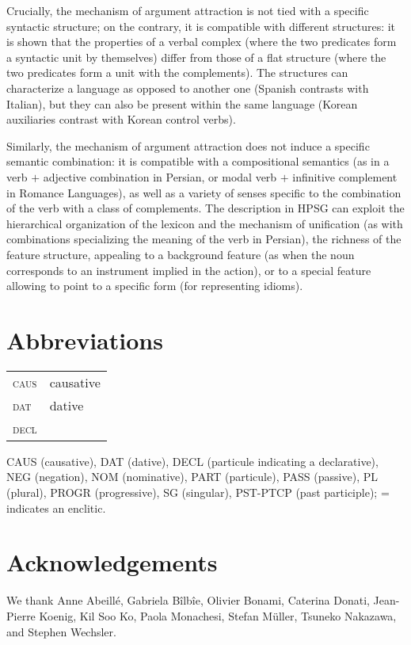 \documentclass[output=paper
                ,modfonts
                ,nonflat
	        ,collection
	        ,collectionchapter
	        ,collectiontoclongg
 	        ,biblatex
                ,babelshorthands
                ,newtxmath
                ,draftmode
                ,colorlinks, citecolor=brown
]{./langsci/langscibook}
\begin{document}
{Crucially, the mechanism of argument attraction is not tied with a specific syntactic structure; on the contrary, it is compatible with different structures: it is shown that the properties of a verbal complex (where the two predicates form a syntactic unit by themselves) differ from those of a flat structure (where the two predicates form a unit with the complements). The structures can characterize a language as opposed to another one (Spanish contrasts with Italian), but they can also be present within the same language (Korean auxiliaries contrast with Korean control verbs).

Similarly, the mechanism of argument attraction does not induce a specific semantic combination: it is compatible with a compositional semantics (as in a verb $+$ adjective combination in Persian, or modal verb $+$ infinitive complement in Romance Languages), as well as a variety of senses specific to the combination of the verb with a class of complements. The description in HPSG can exploit the hierarchical organization of the lexicon and the mechanism of unification (as with combinations specializing the meaning of the verb in Persian), the richness of the feature structure, appealing to a background feature (as when the noun corresponds to an instrument implied in the action), or to a special feature allowing to point to a specific form (for representing idioms).    

} %

\section*{Abbreviations}


\begin{tabularx}{.99\textwidth}{@{}lX}
\textsc{caus} & causative\\
\textsc{dat} & dative\\
\textsc{decl} & \\
\end{tabularx}


CAUS (causative), DAT (dative), DECL (particule indicating a declarative), 
NEG (negation), NOM (nominative), PART (particule), PASS (passive), PL (plural), PROGR
(progressive), SG (singular), PST-PTCP (past participle); = indicates an enclitic.

\section*{Acknowledgements}

We thank Anne Abeill\'e, Gabriela B\^ilb\^ie, Olivier Bonami, Caterina Donati,
  Jean-Pierre Koenig, Kil Soo Ko, Paola Monachesi, Stefan Müller, Tsuneko Nakazawa, and Stephen
  Wechsler. 

{\sloppy
	\printbibliography[heading=subbibliography,notkeyword=this]
}
\end{document}
